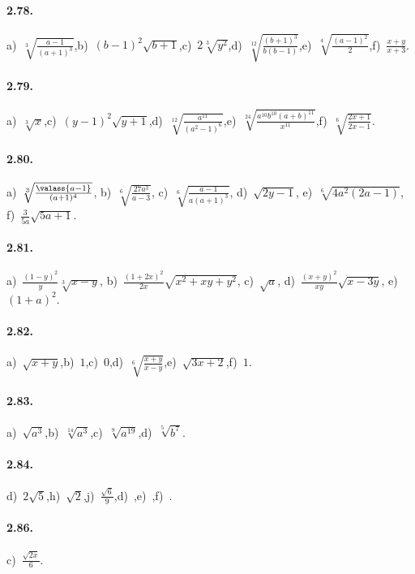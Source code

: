\paragraph{2.78.}
a)~$\sqrt[3]{\frac{a-1}{(a+1)^3}}$,\quad b)~$(b-1)^2\sqrt{b+1}$,\quad c)~$2\sqrt[3]{y^2}$,\quad d)~$\sqrt[12]{\frac{(b+1)^3}{b(b-1)}}$,\quad e)~$\sqrt[4]{\frac{(a-1)^2} 2}$,\quad f)~$\frac{x+y}{x+3}$.

\paragraph{2.79.}
a)~$\sqrt[3]x$,\quad c)~$(y-1)^2\sqrt{y+1}$,\quad d)~$\sqrt[12]{\frac{a^{11}}{(a^2-1)^6}}$,\quad e)~$\sqrt[24]{\frac{a^{10}b^{10}(a+b)^{11}}{x^{11}}}$,\quad f)~$\sqrt[6]{\frac{2x+1}{2x-1}}$.

\paragraph{2.80.}
a)~$\sqrt[3]{\frac{\valass{a-1}}{(a+1)^4}}$,\; b)~$\sqrt[6]{\frac{27a^3}{a-3}}$,\; c)~$\sqrt[6]{\frac{a-1}{a(a+1)^3}}$,\; d)~$\sqrt{2y-1}$,\; e)~$\sqrt[6]{4a^2(2a-1)}$,\; f)~$\frac 3{5a}\sqrt{5a+1}$.

\paragraph{2.81.}
a)~$\frac{(1-y)^2} y\sqrt[3]{x-y}$,\; b)~$\frac{(1+2x)^2}{2x}\sqrt{x^2+xy+y^2}$,\; c)~$\sqrt a$,\; d)~$\frac{(x+y)^2}{xy}\sqrt{x-3y}$,\; e)~$(1+a)^2$.

\paragraph{2.82.}
a)~$\sqrt{x+y}$,\quad b)~$1$,\quad c)~$0$,\quad d)~$\sqrt[6]{\frac{x+y}{x-y}}$,\quad e)~$\sqrt{3x+2}$,\quad f)~$1$.

\paragraph{2.83.}
a)~$\sqrt{a^3}$,\quad b)~$\sqrt[14]{a^3}$,\quad c)~$\sqrt[9]{a^{19}}$,\quad d)~$\sqrt[5]{b^7}$.

\paragraph{2.84.}
d)~$2\sqrt 5$,\quad h)~$\sqrt 2$,\quad j)~$\frac{\sqrt 6} 9$,\quad d)~,\quad e)~,\quad f)~.

\paragraph{2.86.}
c)~$\frac{\sqrt{2x}} 6$.

